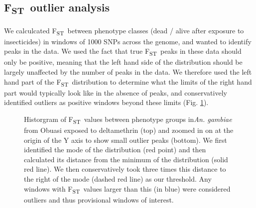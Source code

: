 \documentclass[a4paper,12pt]{article}
\newcommand{\fst}{F\textsubscript{ST}}
\begin{document}
\clearpage

\subsection{\fst\ outlier analysis}

We calculcated \fst\ between phenotype classes (dead / alive after exposure to insecticides) in windows of 1000 SNPs across the genome, and wanted to identify peaks in the data. We used the fact that true \fst\ peaks in these data should only be positive, meaning that the left hand side of the distribution should be largely unaffected by the number of peaks in the data. We therefore used the left hand part of the \fst\ distribution to determine what the limits of the right hand part would typically look like in the absence of peaks, and conservatively identified outliers as positive windows beyond these limits (Fig. \ref{FigM3}).


\begin{figure}[h]
	\hspace*{-1cm}
	\begin{minipage}{\textwidth}
		\begin{center}
		\end{center}
	\end{minipage}
	\caption{\footnotesize Historgram of \fst\ values between phenotype groups in\textit{An. gambiae} from Obuasi exposed to deltamethrin (top) and zoomed in on at the origin of the Y axis to show small outlier peaks (bottom). We first identified the mode of the distribution (red point) and then calculated its distance from the minimum of the distribution (solid red line). We then conservatively took three times this distance to the right of the mode (dashed red line) as our threshold. Any windows with \fst\ values larger than this (in blue) were considered outliers and thus provisional windows of interest.}
	\label{FigM3}
\end{figure}
\end{document}

